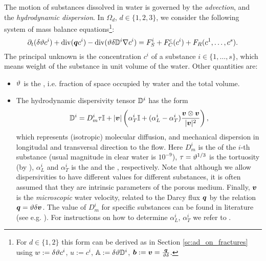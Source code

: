 The motion of substances dissolved in water is governed by the \emph{advection}, and the \emph{hydrodynamic dispersion}.
In $\Omega_d$, $d\in\{1,2,3\}$, we consider the following system of mass balance equations\footnote{For $d\in\{1,2\}$ this form can be derived as in Section \ref{sc:ad_on_fractures} using $w:=\delta\vartheta c^i$, $u:=c^i$, ${\mathbb{A}}:=\delta\vartheta{\mathbb{D}}^i$, $\mathbf{\boldsymbol{b}}:=\mathbf{\boldsymbol{v}}=\frac{\mathbf{\boldsymbol{q}}}{\vartheta\delta}$.}:
\begin{equation}
    \label{e:ADE}
   \partial_t ( \delta \th c^i) + \div ( \vc q c^i ) - \div (\th \delta \D^i \grad c^i ) = F_S^i + F^c_C(c^i) + F_R(c^1,\dots, c^s).
\end{equation}
The principal unknown is the concentration $c^i$  of a substance $i\in\{1,\dots, s\}$, which means weight of the substance in unit volume of the water.
Other quantities are:
\begin{itemize}

\item $\vartheta$ \units{}{}{} is the , i.e. fraction of space occupied by water and the total volume.
\item The hydrodynamic dispersivity tensor ${{\mathbb{D}}}^i$  has the form
\begin{equation} 
  \label{eqn:transport_disp}
  \D^i =D_m^i \tau \tn I + \abs{\vc v}\left(\alpha_T^i \tn I + (\alpha_L^i - \alpha_T^i) \frac{\vc v \otimes \vc v}{\abs{\vc v}^2}\right),
\end{equation}
which represents (isotropic) molecular diffusion, and mechanical dispersion in longitudal and transversal direction to the flow.
Here $D_m^i$  is the  of the $i$-th substance (usual magnitude in clear water is $10^{-9}$), $\tau=\vartheta^{1/3}$ is the tortuosity (by \cite{millington_quirk}), $\alpha_L^i$  and $\alpha_T^i$  is the  and the , respectively.
Note that although we allow dispersivities to have different values for different substances, it is often assumed that they are intrinsic parameters of the porous medium.
Finally, $\mathbf{\boldsymbol{v}}$  is the \emph{microscopic} water velocity, related to the Darcy flux $\mathbf{\boldsymbol{q}}$ by the relation $\mathbf{\boldsymbol{q}} = \vartheta\delta\mathbf{\boldsymbol{v}}$.
The value of $D_m^i$ for specific substances can be found in literature (see e.g. \cite{cislerova_vogel}).
For instructions on how to determine $\alpha_L^i$, $\alpha_T^i$ we refer to \cite{marsily,domenico_schwartz}.


\end{itemize}

